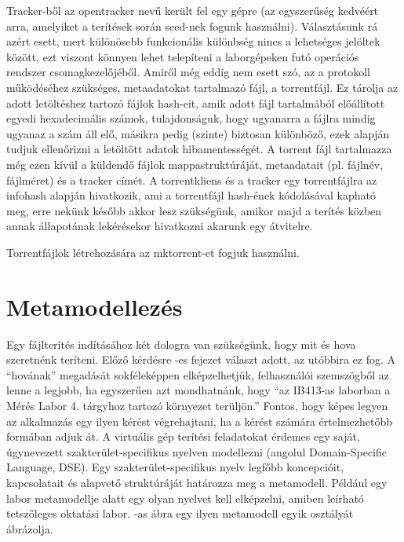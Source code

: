 Tracker-ből az opentracker nevű került fel egy gépre (az egyszerűség kedvéért arra, amelyiket a terítések során seed-nek fogunk használni). Választásunk rá azért esett, mert különösebb funkcionális különbség nincs a lehetséges jelöltek között, ezt viszont könnyen lehet telepíteni a laborgépeken futó operációs rendszer csomagkezelőjéből. Amiről még eddig nem esett szó, az a protokoll működéséhez szükséges, metaadatokat tartalmazó fájl, a torrentfájl. Ez tárolja az adott letöltéshez tartozó fájlok hash-eit, amik adott fájl tartalmából előállított egyedi hexadecimális számok, tulajdonságuk, hogy ugyanarra a fájlra mindig ugyanaz a szám áll elő, másikra pedig (szinte) biztosan különböző, ezek alapján tudjuk ellenőrizni a letöltött adatok hibamentességét. A torrent fájl tartalmazza még ezen kívül a küldendő fájlok mappastruktúráját, metaadatait (pl. fájlnév, fájlméret) és a tracker címét. A torrentkliens és a tracker egy torrentfájlra az infohash alapján hivatkozik, ami a torrentfájl hash-ének kódolásával kapható meg, erre nekünk később akkor lesz szükségünk, amikor majd a terítés közben annak állapotának lekérésekor hivatkozni akarunk egy átvitelre.

Torrentfájlok létrehozására az mktorrent-et\cite{mktorrent} fogjuk használni.


\section{Metamodellezés}
Egy fájlterítés indításához két dologra van szükségünk, hogy mit és hova szeretnénk teríteni. Előző kérdésre -es fejezet választ adott, az utóbbira ez fog. A ``hovának'' megadását sokféleképpen elképzelhetjük,  felhasználói szemszögből az lenne a legjobb, ha egyszerűen azt mondhatnánk, hogy ``az IB413-as laborban a Mérés Labor 4. tárgyhoz tartozó környezet terüljön.'' Fontos, hogy képes legyen az alkalmazás egy ilyen kérést végrehajtani, ha a kérést számára értelmezhetőbb formában adjuk át. 
A virtuális gép terítési feladatokat érdemes egy saját, úgynevezett szakterület-specifikus nyelven modellezni (angolul Domain-Specific Language, DSE). Egy szakterület-specifikus nyelv legfőbb koncepcióit, kapcsolatait és alapvető struktúráját határozza meg a metamodell. Például egy labor metamodellje alatt egy olyan nyelvet kell elképzelni, amiben leírható tetszőleges oktatási labor. -as ábra egy ilyen metamodell egyik osztályát ábrázolja.

